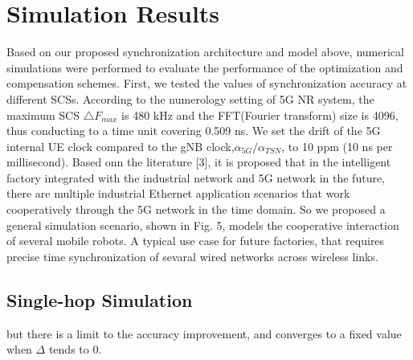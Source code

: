 \documentclass[english]{cccconf}
\begin{document}
{\section{Simulation Results}
Based on our proposed synchronization architecture and model above, numerical simulations were performed to evaluate the performance of the optimization and compensation schemes. First, we tested the values of synchronization accuracy at different SCSs. According to the numerology setting of 5G NR system\cite{access2015requirements}, the maximum SCS $\triangle F_{max}$ is 480 kHz and the FFT(Fourier transform) size is 4096, thus conducting to a time unit covering 0.509 ns. We set the drift of the 5G internal UE clock compared to the gNB clock,$\alpha_{5G}/\alpha_{TSN}$, to 10 ppm (10 ns per millisecond).
Based onn the literature [3], it is proposed that in the intelligent factory integrated with the industrial network and 5G network in the future, there are multiple industrial Ethernet application scenarios that work cooperatively through the 5G network in the time domain. So we proposed a general simulation scenario, shown in Fig. 5, models the cooperative interaction of several mobile robots. A typical use case for future factories, that requires precise time synchronization of sevaral wired networks across wireless links.

\subsection{Single-hop Simulation}

but there is a limit to the accuracy improvement, and converges to a fixed value when $\Delta$ tends to 0.

}
\end{document}
